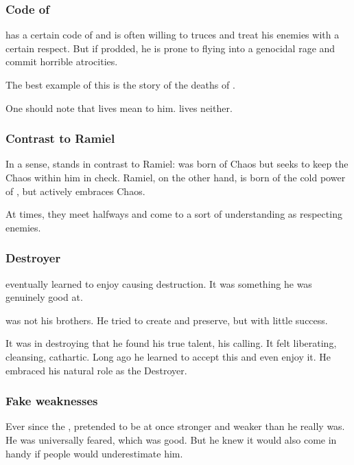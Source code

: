 \subsubsection{Code of \honour}
\Ishnaruchaefir{} has a certain code of \honour and is often willing to \honour truces and treat his enemies with a certain respect. 
But if prodded, he is prone to flying into a genocidal rage and commit horrible atrocities. 

The best example of this is the story of the deaths of . 

One should note that \resphan{} lives mean  to him. 
\Human{} lives neither. 





\subsubsection{Contrast to Ramiel}
In a sense, \Ishnaruchaefir{} stands in contrast to Ramiel: 
\Ishnaruchaefir{} was born of Chaos but seeks to keep the Chaos within him in check. 
Ramiel, on the other hand, is born of the cold power of \Erebos, but actively embraces Chaos.

At times, they meet halfways and come to a sort of understanding as respecting enemies.





\subsubsection{Destroyer}
\Ishnaruchaefir eventually learned to enjoy causing destruction. 
It was something he was genuinely good at.
 
\Ishnaruchaefir was not his brothers. 
He tried to create and preserve, but with little success. 

It was in destroying that he found his true talent, his calling. 
It felt liberating, cleansing, cathartic. 
Long ago he learned to accept this and even enjoy it. 
He embraced his natural role as the Destroyer. 





\subsubsection{Fake weaknesses}
Ever since the \secondbanewar, \Ishnaruchaefir{} pretended to be at once stronger and weaker than he really was. 
He was universally feared, which was good. 
But he knew it would also come in handy if people would underestimate him. 


